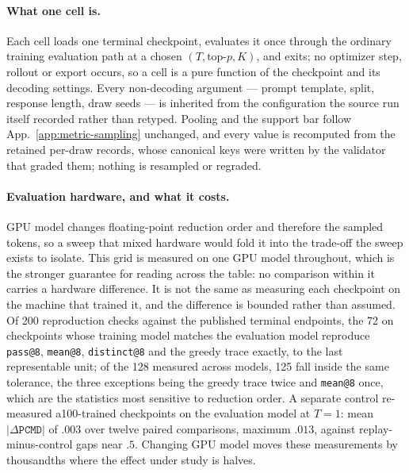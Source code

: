 \documentclass{article}
\makeatletter
\newcommand{\1}{\mathbf 1}
\newcommand{\pmd}{\texttt{PCMD}}
\newcommand{\distk}{\texttt{distinct@8}}
\theoremstyle{remark}
\theoremstyle{definition}
\theoremstyle{plain}
\makeatother
\begin{document}
\paragraph{What one cell is.}
Each cell loads one terminal checkpoint, evaluates it once through the ordinary
training evaluation path at a chosen $(T,\text{top-}p,K)$, and exits; no
optimizer step, rollout or export occurs, so a cell is a pure function of the
checkpoint and its decoding settings. Every non-decoding argument --- prompt
template, split, response length, draw seeds --- is inherited from the
configuration the source run itself recorded rather than retyped. Pooling and
the support bar follow App.~\ref{app:metric-sampling} unchanged, and every value
is recomputed from the retained per-draw records, whose canonical keys were
written by the validator that graded them; nothing is resampled or regraded.

\paragraph{Evaluation hardware, and what it costs.}
GPU model changes floating-point reduction order and therefore the sampled
tokens, so a sweep that mixed hardware would fold it into the trade-off the
sweep exists to isolate. This grid is measured on one GPU model throughout,
which is the stronger guarantee for reading across the table: no comparison
within it carries a hardware difference. It is not the same as measuring each
checkpoint on the machine that trained it, and the difference is bounded rather
than assumed. Of 200 reproduction checks against the published terminal
endpoints, the 72 on checkpoints whose training model matches the evaluation
model reproduce \texttt{pass@8}, \texttt{mean@8}, \distk{} and the greedy trace
exactly, to the last representable unit; of the 128 measured across models, 125
fall inside the same tolerance, the three exceptions being the greedy trace
twice and \texttt{mean@8} once, which are the statistics most sensitive to
reduction order. A separate control re-measured a100-trained checkpoints on the
evaluation model at $T=1$: mean $|\Delta\pmd{}|$ of $.003$ over twelve paired
comparisons, maximum $.013$, against replay-minus-control gaps near $.5$.
Changing GPU model moves these measurements by thousandths where the effect
under study is halves.
\end{document}
